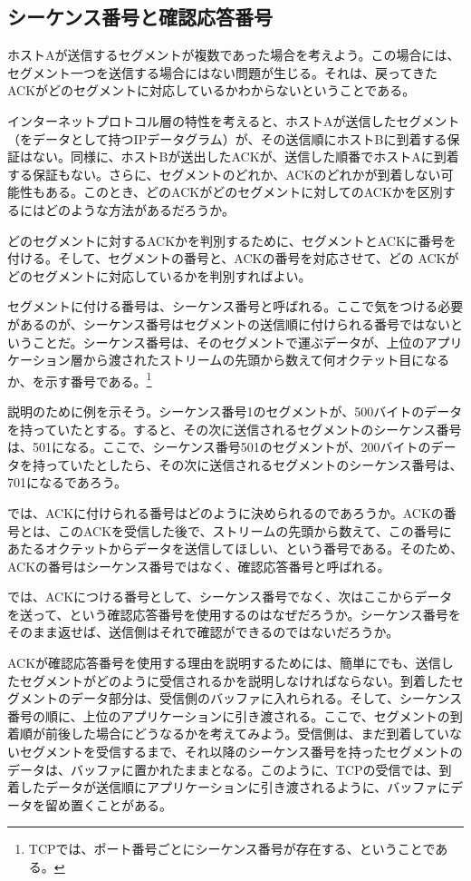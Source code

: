\subsection{シーケンス番号と確認応答番号}


ホストAが送信するセグメントが複数であった場合を考えよう。この場合には、セグメント一つを送信する場合にはない問題が生じる。それは、戻ってきたACKがどのセグメントに対応しているかわからないということである。

インターネットプロトコル層の特性を考えると、ホストAが送信したセグメント（をデータとして持つIPデータグラム）が、その送信順にホストBに到着する保証はない。同様に、ホストBが送出したACKが、送信した順番でホストAに到着する保証もない。さらに、セグメントのどれか、ACKのどれかが到着しない可能性もある。このとき、どのACKがどのセグメントに対してのACKかを区別するにはどのような方法があるだろうか。

どのセグメントに対するACKかを判別するために、セグメントとACKに番号を付ける。そして、セグメントの番号と、ACKの番号を対応させて、どの ACKがどのセグメントに対応しているかを判別すればよい。

セグメントに付ける番号は、シーケンス番号と呼ばれる。ここで気をつける必要があるのが、シーケンス番号はセグメントの送信順に付けられる番号ではないということだ。シーケンス番号は、そのセグメントで運ぶデータが、上位のアプリケーション層から渡されたストリームの先頭から数えて何オクテット目になるか、を示す番号である。\footnote{TCPでは、ポート番号ごとにシーケンス番号が存在する、ということである。}

説明のために例を示そう。シーケンス番号1のセグメントが、500バイトのデータを持っていたとする。すると、その次に送信されるセグメントのシーケンス番号は、501になる。ここで、シーケンス番号501のセグメントが、200バイトのデータを持っていたとしたら、その次に送信されるセグメントのシーケンス番号は、701になるであろう。

では、ACKに付けられる番号はどのように決められるのであろうか。ACKの番号とは、このACKを受信した後で、ストリームの先頭から数えて、この番号にあたるオクテットからデータを送信してほしい、という番号である。そのため、ACKの番号はシーケンス番号ではなく、確認応答番号と呼ばれる。

では、ACKにつける番号として、シーケンス番号でなく、次はここからデータを送って、という確認応答番号を使用するのはなぜだろうか。シーケンス番号をそのまま返せば、送信側はそれで確認ができるのではないだろうか。

ACKが確認応答番号を使用する理由を説明するためには、簡単にでも、送信したセグメントがどのように受信されるかを説明しなければならない。到着したセグメントのデータ部分は、受信側のバッファに入れられる。そして、シーケンス番号の順に、上位のアプリケーションに引き渡される。ここで、セグメントの到着順が前後した場合にどうなるかを考えてみよう。受信側は、まだ到着していないセグメントを受信するまで、それ以降のシーケンス番号を持ったセグメントのデータは、バッファに置かれたままとなる。このように、TCPの受信では、到着したデータが送信順にアプリケーションに引き渡されるように、バッファにデータを留め置くことがある。

